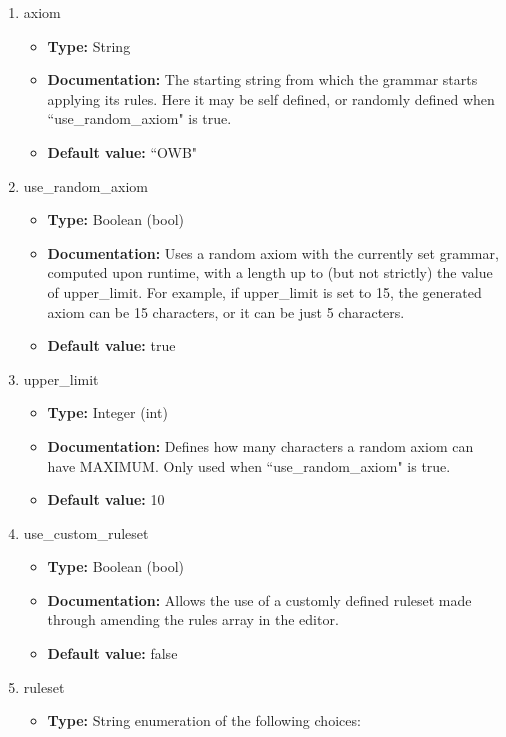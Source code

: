 \begin{enumerate}
    \item axiom
    \begin{itemize}
        \item \textbf{Type:} String
        \item \textbf{Documentation:} The starting string from which the grammar starts applying its rules. Here it may be self defined, or randomly defined when ``use\_random\_axiom" is true.
        \item \textbf{Default value:} ``OWB"
    \end{itemize}
    \item use\_random\_axiom
    \begin{itemize}
        \item \textbf{Type:} Boolean (bool) 
        \item \textbf{Documentation:} Uses a random axiom with the currently set grammar, computed upon runtime, with a length up to (but not strictly) the value of upper\_limit. For example, if upper\_limit is set to 15, the generated axiom can be 15 characters, or it can be just 5 characters.
        \item \textbf{Default value:} true
    \end{itemize}
    \item upper\_limit
    \begin{itemize}
        \item \textbf{Type:} Integer (int)
        \item \textbf{Documentation:} Defines how many characters a random axiom can have MAXIMUM. Only used when ``use\_random\_axiom" is true.
        \item \textbf{Default value:} 10
    \end{itemize}
    \item use\_custom\_ruleset
    \begin{itemize}
        \item \textbf{Type:} Boolean (bool)
        \item \textbf{Documentation:} Allows the use of a customly defined ruleset made through amending the rules array in the editor.
        \item \textbf{Default value:} false
    \end{itemize}
    \item ruleset
    \begin{itemize}
        \item \textbf{Type:} String enumeration of the following choices:

\end{itemize}
\end{enumerate}
